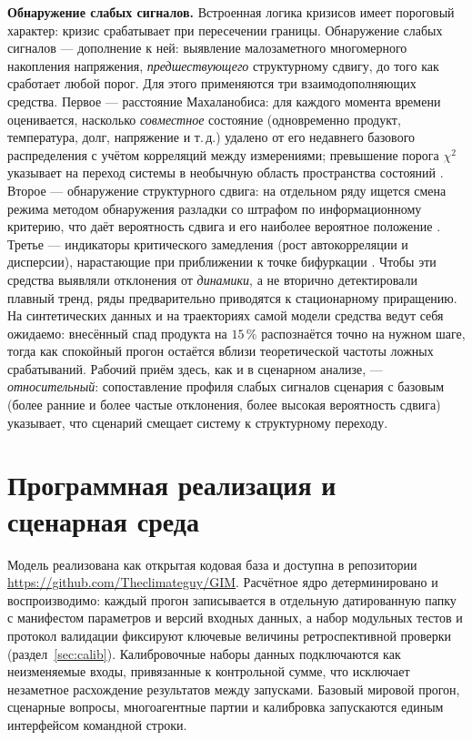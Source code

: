 \documentclass[11pt,a4paper]{article}
\begin{document}
\textbf{Обнаружение слабых сигналов.} Встроенная логика кризисов имеет пороговый характер: кризис
срабатывает при пересечении границы. Обнаружение слабых сигналов --- дополнение к ней:
выявление малозаметного многомерного накопления напряжения, \emph{предшествующего}
структурному сдвигу, до того как сработает любой порог. Для этого применяются три
взаимодополняющих средства. Первое --- расстояние Махаланобиса: для каждого момента
времени оценивается, насколько \emph{совместное} состояние (одновременно продукт,
температура, долг, напряжение и т.\,д.) удалено от его недавнего базового распределения с
учётом корреляций между измерениями; превышение порога $\chi^2$ указывает на переход
системы в необычную область пространства состояний \citep{mahalanobis1936,wilson1931}.
Второе --- обнаружение структурного сдвига: на отдельном ряду ищется смена режима методом
обнаружения разладки со штрафом по информационному критерию, что даёт вероятность сдвига и
его наиболее вероятное положение \citep{schwarz1978}. Третье --- индикаторы критического
замедления (рост автокорреляции и дисперсии), нарастающие при приближении к точке
бифуркации \citep{scheffer2009}. Чтобы эти средства выявляли отклонения от \emph{динамики},
а не вторично детектировали плавный тренд, ряды предварительно приводятся к стационарному
приращению. На синтетических данных и на траекториях самой модели средства ведут себя
ожидаемо: внесённый спад продукта на $15\,\%$ распознаётся точно на нужном шаге, тогда как
спокойный прогон остаётся вблизи теоретической частоты ложных срабатываний. Рабочий приём
здесь, как и в сценарном анализе, --- \emph{относительный}: сопоставление профиля слабых
сигналов сценария с базовым (более ранние и более частые отклонения, более высокая
вероятность сдвига) указывает, что сценарий смещает систему к структурному переходу.

\section{Программная реализация и сценарная среда}
\label{sec:repo}

Модель реализована как открытая кодовая база и доступна в репозитории
\url{https://github.com/Theclimateguy/GIM}. Расчётное ядро детерминировано и
воспроизводимо: каждый прогон записывается в отдельную датированную папку с манифестом
параметров и версий входных данных, а набор модульных тестов и протокол валидации фиксируют
ключевые величины ретроспективной проверки (раздел~\ref{sec:calib}). Калибровочные наборы
данных подключаются как неизменяемые входы, привязанные к контрольной сумме, что исключает
незаметное расхождение результатов между запусками. Базовый мировой прогон, сценарные
вопросы, многоагентные партии и калибровка запускаются единым интерфейсом командной строки.
\end{document}
